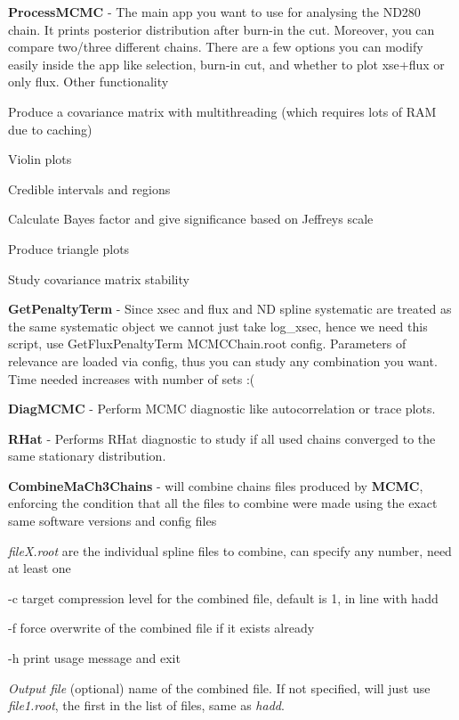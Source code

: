 {\bfseries{Process\+MCMC}} -\/ The main app you want to use for analysing the ND280 chain. It prints posterior distribution after burn-\/in the cut. Moreover, you can compare two/three different chains. There are a few options you can modify easily inside the app like selection, burn-\/in cut, and whether to plot xse+flux or only flux. Other functionality 
\begin{DoxyEnumerate}
\item Produce a covariance matrix with multithreading (which requires lots of RAM due to caching)  
\item Violin plots  
\item Credible intervals and regions  
\item Calculate Bayes factor and give significance based on Jeffreys scale  
\item Produce triangle plots  
\item Study covariance matrix stability  
\end{DoxyEnumerate}

{\bfseries{Get\+Penalty\+Term}} -\/ Since xsec and flux and ND spline systematic are treated as the same systematic object we cannot just take log\+\_\+xsec, hence we need this script, use {\ttfamily Get\+Flux\+Penalty\+Term MCMCChain.\+root config}. Parameters of relevance are loaded via config, thus you can study any combination you want. Time needed increases with number of sets \+:(

{\bfseries{Diag\+MCMC}} -\/ Perform MCMC diagnostic like autocorrelation or trace plots.

{\bfseries{RHat}} -\/ Performs RHat diagnostic to study if all used chains converged to the same stationary distribution. 
\begin{DoxyCode}{0}

\end{DoxyCode}


{\bfseries{Combine\+Ma\+Ch3\+Chains}} -\/ will combine chains files produced by {\bfseries{MCMC}}, enforcing the condition that all the files to combine were made using the exact same software versions and config files 
\begin{DoxyCode}{0}

\end{DoxyCode}
 {\itshape file\+X.\+root} are the individual spline files to combine, can specify any number, need at least one

-\/c target compression level for the combined file, default is 1, in line with hadd

-\/f force overwrite of the combined file if it exists already

-\/h print usage message and exit

{\itshape Output file} (optional) name of the combined file. If not specified, will just use {\itshape file1.\+root}, the first in the list of files, same as {\itshape hadd}. 